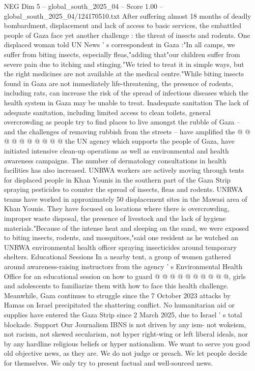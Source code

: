 \begin{textsample}{NEG Dim 5 – global\_south\_2025\_04 – Score 1.00 – global\_south\_2025\_04/124170510.txt}  \label{ex:f5_neg_391}
After suffering almost 18 months of deadly bombardment, displacement and lack of access to basic services, the embattled people of Gaza face yet another challenge : the threat of insects and rodents.
One displaced woman told UN News ' s correspondent in Gaza :"In all camps, we suffer from biting insects, especially fleas,"adding that"our children suffer from severe pain due to itching and stinging."We tried to treat it in simple ways, but the right medicines are not available at the medical centre."While biting insects found in Gaza are not immediately life-threatening, the presence of rodents, including rats, can increase the risk of the spread of infectious diseases which the health system in Gaza may be unable to treat.
Inadequate sanitation The lack of adequate sanitation, including limited access to clean toilets, general overcrowding as people try to find places to live amongst the rubble of Gaza -- and the challenges of removing rubbish from the streets -- have amplified the @ @ @ @ @ @ @ @ @ @ the UN agency which supports the people of Gaza, have initiated intensive clean-up operations as well as environmental and health awareness campaigns.
The number of dermatology consultations in health facilities has also increased.
UNRWA workers are actively moving through tents for displaced people in Khan Younis in the southern part of the Gaza Strip spraying pesticides to counter the spread of insects, fleas and rodents.
UNRWA teams have worked in approximately 50 displacement sites in the Mawasi area of Khan Younis.
They have focused on locations where there is overcrowding, improper waste disposal, the presence of livestock and the lack of hygiene materials."Because of the intense heat and sleeping on the sand, we were exposed to biting insects, rodents, and mosquitoes,"said one resident as he watched an UNRWA environmental health officer spraying insecticides around temporary shelters.
Educational Sessions In a nearby tent, a group of women gathered around awareness-raising instructors from the agency ' s Environmental Health Office for an educational session on how to guard @ @ @ @ @ @ @ @ @ @, girls and adolescents to familiarize them with how to face this health challenge.
Meanwhile, Gaza continues to struggle since the 7 October 2023 attacks by Hamas on Israel precipitated the shattering conflict.
No humanitarian aid or supplies have entered the Gaza Strip since 2 March 2025, due to Israel ' s total blockade.
Support Our Journalism IBNS is not driven by any ism- not wokeism, not racism, not skewed secularism, not hyper right-wing or left liberal ideals, nor by any hardline religious beliefs or hyper nationalism.
We want to serve you good old objective news, as they are.
We do not judge or preach.
We let people decide for themselves.
We only try to present factual and well-sourced news.

\end{textsample}
